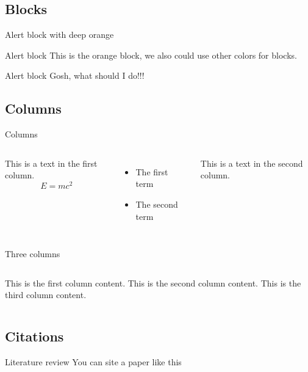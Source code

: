 \documentclass[aspectratio=169, 12pt]{beamer}    %
\begin{document}
\subsection{Blocks}
\begin{frame}{Alert block with deep orange}
    \begin{alertblock}{Alert block}
        This is the orange block, we also could use other colors for blocks.
    \end{alertblock}
    
    \begin{alertblock}{Alert block}
        Gosh, what should I do!!!
    \end{alertblock}  
\end{frame}


\subsection{Columns}
\begin{frame}{Columns}
    \begin{columns}
    This is a text in the first column.
    $$E = mc^2 $$
    \begin{itemize}
        \item The first term
        \item The second term
    \end{itemize}
    
    This is a text in the second column.
    \end{columns}
\end{frame}

\begin{frame}{Three columns}
    \begin{columns}
        This is the first column content.
        This is the second column content.
        This is the third column content.
    \end{columns}
\end{frame}


\subsection{Citations}
\begin{frame}{Literature review}
    You can site a paper like this \cite{teichmann2019machine, buehler2019deep}
\end{frame}
\end{document}
